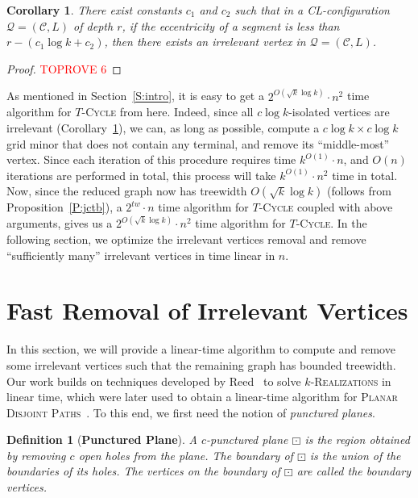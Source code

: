 \documentclass{article}
\newtheorem{corollary}[theorem]{Corollary}
\newtheorem{definition}[theorem]{Definition}
\numberwithin{claimcounter}{lemma}
\newcommand{\tcycle}{$T$-\textsc{Cycle}\xspace}
\begin{document}
\begin{corollary}\label{C:irrelevant}
  There exist constants $c_1$ and $c_2$ such that in a  CL-configuration $\mathcal{Q}=(\mathcal{C},L)$ of depth $r$, if the eccentricity of a segment is less than $r - (c_1 \log k + c_2)$, then there exists an irrelevant vertex in $\mathcal{Q}=(\mathcal{C},L)$.
\end{corollary}
\begin{proof}\textcolor{red}{TOPROVE 6}\end{proof}

As mentioned in Section~\ref{S:intro}, it is easy to get a $2^{O(\sqrt{k}\log k)}\cdot n^2$ time algorithm for \tcycle from here. Indeed,  since all $c\log k$-isolated vertices are irrelevant (Corollary~\ref{C:irrelevant}), we can, as long as possible, compute a $c\log k\times c\log k$ grid minor that does not contain any terminal, and remove its ``middle-most'' vertex. Since each iteration of this procedure requires time $k^{O(1)}\cdot n$, and $O(n)$ iterations are performed in total, this process will take  $k^{O(1)}\cdot n^2$ time in total. Now, since the reduced graph now has treewidth  $O(\sqrt{k}\log k)$ (follows from Proposition~\ref{P:jctb}), a $2^{tw}\cdot n$ time algorithm for \tcycle coupled with above arguments, gives us a $2^{O(\sqrt{k}\log k)}\cdot n^2$ time algorithm for \tcycle. In the following section, we optimize the irrelevant vertices removal and remove ``sufficiently many'' irrelevant vertices in time linear in $n$.

\section{Fast Removal of Irrelevant Vertices} \label{sec:reeddeco}
In this section, we will provide a linear-time algorithm to compute and remove some irrelevant vertices such that the remaining graph has bounded treewidth. Our work builds on techniques developed by Reed~\cite{reedLinear} to solve $k$-\textsc{Realizations} in linear time, which were later used to obtain a linear-time algorithm for \textsc{Planar Disjoint Paths}~\cite{cho2023parameterized}. To this end, we first need the notion of \textit{punctured planes}.

\begin{definition}[{\bf Punctured Plane}]
    A $c${\em-punctured plane} $\boxdot$ is the region obtained by removing $c$ open holes from the plane. The \textit{boundary} of $\boxdot$ is the union of the boundaries of its holes. The vertices on the boundary of $\boxdot$ are called the {\em boundary vertices}.
\end{definition}
\end{document}
